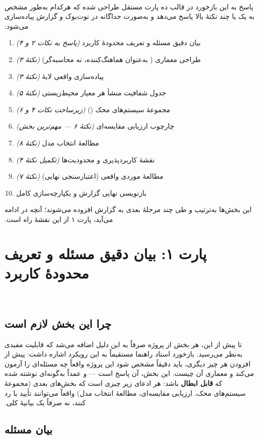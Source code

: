 ‫\documentclass[a4paper,12pt]{article}
\begin{document}
‫پاسخ به این بازخورد در قالب ده پارت مستقل طراحی شده که هرکدام
‫به‌طور مشخص به یک یا چند نکتهٔ بالا پاسخ می‌دهد و به‌صورت جداگانه
‫در نوت‌بوک و گزارش پیاده‌سازی می‌شود:
‫
‫\begin{enumerate}
‫\item بیان دقیق مسئله و تعریف محدودهٔ کاربرد \hfill \emph{(پاسخ به نکات ۲ و ۴)}
‫\item طراحی معماری  ( به‌عنوان هماهنگ‌کننده، نه محاسبه‌گر) \hfill \emph{(نکتهٔ ۳)}
‫\item پیاده‌سازی واقعی لایهٔ  \hfill \emph{(نکتهٔ ۳)}
‫\item جدول شفافیت منشأ هر معیار محیط‌زیستی \hfill \emph{(نکتهٔ ۵)}
‫\item مجموعهٔ سیستم‌های محک () \hfill \emph{(زیرساخت نکات ۴ و ۶)}
‫\item چارچوب ارزیابی مقایسه‌ای \hfill \emph{(نکتهٔ ۶ — مهم‌ترین بخش)}
‫\item مطالعهٔ انتخاب مدل  \hfill \emph{(نکتهٔ ۸)}
‫\item نقشهٔ کاربردپذیری و محدودیت‌ها \hfill \emph{(تکمیل نکتهٔ ۴)}
‫\item مطالعهٔ موردی واقعی (اعتبارسنجی نهایی) \hfill \emph{(نکتهٔ ۷)}
‫\item بازنویسی نهایی گزارش و یکپارچه‌سازی کامل
‫\end{enumerate}
‫
‫این بخش‌ها به‌ترتیب و طی چند مرحلهٔ بعدی به گزارش افزوده می‌شوند؛
‫آنچه در ادامه می‌آید، پارت ۱ از این نقشهٔ راه است.
‫
‫\section{پارت ۱: بیان دقیق مسئله و تعریف محدودهٔ کاربرد}
‫
‫\subsection{چرا این بخش لازم است}
‫تا پیش از این، هر بخش از پروژه صرفاً به این دلیل اضافه می‌شد که
‫قابلیت مفیدی به‌نظر می‌رسید. بازخورد استاد راهنما مستقیماً به این
‫رویکرد اشاره داشت: پیش از افزودن هر چیز دیگری، باید دقیقاً مشخص شود
‫این پروژه واقعاً چه مسئله‌ای را آزمون می‌کند و معماری آن چیست. این
‫بخش، آن پاسخ است — و عمداً به‌گونه‌ای نوشته شده که \textbf{قابل ابطال}
‫باشد: هر ادعای زیر چیزی است که بخش‌های بعدی (مجموعهٔ سیستم‌های محک،
‫ارزیابی مقایسه‌ای، مطالعهٔ انتخاب مدل) واقعاً می‌توانند تأیید یا رد
‫کنند، نه صرفاً یک بیانیهٔ کلی.
‫
‫\subsection{بیان مسئله}
\end{document}
